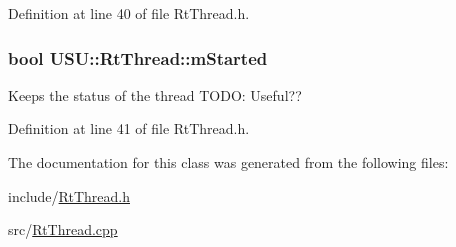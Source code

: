 \-Definition at line 40 of file \-Rt\-Thread.\-h.

\hypertarget{class_u_s_u_1_1_rt_thread_a990cc76b2f9541a6dbafdfa6be5fd367}{
\subsubsection[{m\-Started}]{\setlength{\rightskip}{0pt plus 5cm}bool {\bf \-U\-S\-U\-::\-Rt\-Thread\-::m\-Started}}}\label{class_u_s_u_1_1_rt_thread_a990cc76b2f9541a6dbafdfa6be5fd367}
\-Keeps the status of the thread \-T\-O\-D\-O\-: \-Useful?? 

\-Definition at line 41 of file \-Rt\-Thread.\-h.



\-The documentation for this class was generated from the following files\-:\begin{DoxyCompactItemize}
\item 
include/\hyperlink{_rt_thread_8h}{\-Rt\-Thread.\-h}\item 
src/\hyperlink{_rt_thread_8cpp}{\-Rt\-Thread.\-cpp}\end{DoxyCompactItemize}
